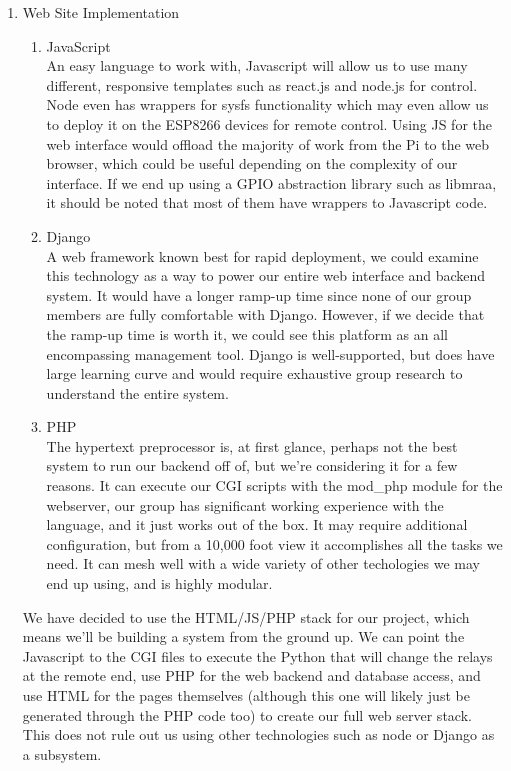 \documentclass[12pt]{article}
\begin{document}
\begin{enumerate}
    \item Web Site Implementation
        \begin{enumerate}
            \item JavaScript \\
            An easy language to work with, Javascript will allow us to use many different, responsive templates such as react.js and node.js for control. Node even has wrappers for sysfs functionality which may even allow us to deploy it on the ESP8266 devices for remote control. Using JS for the web interface would offload the majority of work from the Pi to the web browser, which could be useful depending on the complexity of our interface. If we end up using a GPIO abstraction library such as libmraa, it should be noted that most of them have wrappers to Javascript code.
            \item Django \\
            A web framework known best for rapid deployment, we could examine this technology as a way to power our entire web interface and backend system. It would have a longer ramp-up time since none of our group members are fully comfortable with Django. However, if we decide that the ramp-up time is worth it, we could see this platform as an all encompassing management tool. Django is well-supported, but does have large learning curve and would require exhaustive group research to understand the entire system. 
            \item PHP \\
            The hypertext preprocessor is, at first glance, perhaps not the best system to run our backend off of, but we're considering it for a few reasons. It can execute our CGI scripts with the mod\_php module for the webserver, our group has significant working experience with the language, and it just works out of the box. It may require additional configuration, but from a 10,000 foot view it accomplishes all the tasks we need. It can mesh well with a wide variety of other techologies we may end up using, and is highly modular.
        \end{enumerate}
        We have decided to use the HTML/JS/PHP stack for our project, which means we'll be building a system from the ground up. We can point the Javascript to the CGI files to execute the Python that will change the relays at the remote end, use PHP for the web backend and database access, and use HTML for the pages themselves (although this one will likely just be generated through the PHP code too) to create our full web server stack. This does not rule out us using other technologies such as node or Django as a subsystem.

\end{enumerate}
\end{document}
